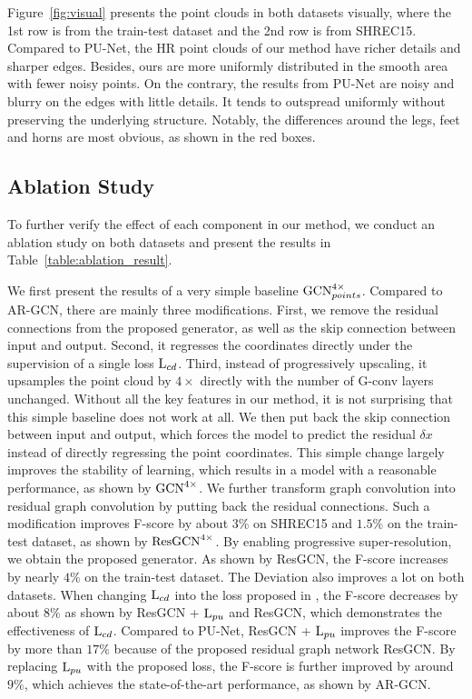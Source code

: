 \documentclass[10pt,twocolumn,letterpaper]{article}
\begin{document}
Figure~\ref{fig:visual} presents the point clouds in both datasets visually, where the 1st row is from the train-test dataset and the 2nd row is from SHREC15.
Compared to PU-Net, the HR point clouds of our method have richer details and sharper edges.
Besides, ours are more uniformly distributed in the smooth area with fewer noisy points.
On the contrary, the results from PU-Net are noisy and blurry on the edges with little details.
It tends to outspread uniformly without preserving the underlying structure.
Notably, the differences around the legs, feet and horns are most obvious, as shown in the red boxes.

\subsection{Ablation Study}
To further verify the effect of each component in our method, we conduct an ablation study on both datasets and present the results in Table~\ref{table:ablation_result}.

We first present the results of a very simple baseline $\textnormal{GCN}_{points}^{4\times}$.
Compared to AR-GCN, there are mainly three modifications.
First, we remove the residual connections from the proposed generator, as well as the skip connection between input and output.
Second, it regresses the coordinates directly under the supervision of a single loss $\textnormal{L}_{cd}$.
Third, instead of progressively upscaling, it upsamples the point cloud by $4\times$ directly with the number of G-conv layers unchanged.
Without all the key features in our method, it is not surprising that this simple baseline does not work at all.
We then put back the skip connection between input and output, which forces the model to predict the residual $\delta x$ instead of directly regressing the point coordinates.
This simple change largely improves the stability of learning, which results in a model with a reasonable performance, as shown by $\textnormal{GCN}^{4\times}$.
We further transform graph convolution into residual graph convolution by putting back the residual connections.
Such a modification improves F-score by about $3\%$ on SHREC15 and $1.5\%$ on the train-test dataset, as shown by $\textnormal{ResGCN}^{4\times}$.
By enabling progressive super-resolution, we obtain the proposed generator.
As shown by ResGCN, the F-score increases by nearly $4\%$ on the train-test dataset.
The Deviation also improves a lot on both datasets.
When changing $\textnormal{L}_{cd}$ into the loss proposed in \cite{yu2018pu}, the F-score decreases by about $8\%$ as shown by ResGCN + $\textnormal{L}_{pu}$ and ResGCN, which demonstrates the effectiveness of $\textnormal{L}_{cd}$.
Compared to PU-Net, ResGCN + $\textnormal{L}_{pu}$ improves the F-score by more than $17\%$ because of the proposed residual graph network ResGCN.
By replacing $\textnormal{L}_{pu}$ with the proposed loss, the F-score is further improved by around $9\%$, which achieves the state-of-the-art performance, as shown by AR-GCN.
\end{document}
